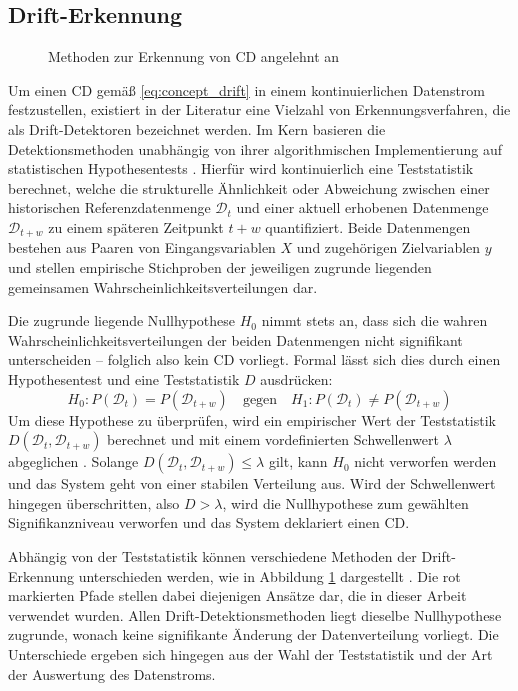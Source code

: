 \subsection{Drift-Erkennung} \label{sec:drift_erkennung}
%
\begin{figure}[hbt!]
    \centering
    
    \caption{Methoden zur Erkennung von \ac{CD} angelehnt an \cite{bayram.2022}}
    \label{fig:drift_detection}
\end{figure}
%
Um einen \ac{CD} gemäß \eqref{eq:concept_drift} in einem kontinuierlichen Datenstrom festzustellen, existiert in der Literatur eine Vielzahl von Erkennungsverfahren, die als Drift-Detektoren bezeichnet werden. Im Kern basieren die Detektionsmethoden unabhängig von ihrer algorithmischen Implementierung auf statistischen Hypothesentests \cite{bayram.2022}. Hierfür wird kontinuierlich eine Teststatistik berechnet, welche die strukturelle Ähnlichkeit oder Abweichung zwischen einer historischen Referenzdatenmenge $\mathcal{D}_t$ und einer aktuell erhobenen Datenmenge $\mathcal{D}_{t+w}$ zu einem späteren Zeitpunkt $t+w$ quantifiziert. Beide Datenmengen bestehen aus Paaren von Eingangsvariablen $X$ und zugehörigen Zielvariablen $y$ und stellen empirische Stichproben der jeweiligen zugrunde liegenden gemeinsamen Wahrscheinlichkeitsverteilungen dar.\par
Die zugrunde liegende Nullhypothese $H_0$ nimmt stets an, dass sich die wahren Wahrscheinlichkeitsverteilungen der beiden Datenmengen nicht signifikant unterscheiden – folglich also kein \ac{CD} vorliegt. Formal lässt sich dies durch einen Hypothesentest und eine Teststatistik $D$ ausdrücken:
%
\begin{equation}
    H_0: P(\mathcal{D}_t) = P(\mathcal{D}_{t+w}) \quad \text{gegen} \quad H_1: P(\mathcal{D}_t) \neq P(\mathcal{D}_{t+w})
    \label{eq:drift_hypothesis}
\end{equation}
%
Um diese Hypothese zu überprüfen, wird ein empirischer Wert der Teststatistik $D(\mathcal{D}_t, \mathcal{D}_{t+w})$ berechnet und mit einem vordefinierten Schwellenwert $\lambda$ abgeglichen \cite{dries.2009}. Solange $D(\mathcal{D}_t, \mathcal{D}_{t+w}) \leq \lambda$ gilt, kann $H_0$ nicht verworfen werden und das System geht von einer stabilen Verteilung aus. Wird der Schwellenwert hingegen überschritten, also $D > \lambda$, wird die Nullhypothese zum gewählten Signifikanzniveau verworfen und das System deklariert einen \ac{CD}. \par
Abhängig von der Teststatistik können verschiedene Methoden der Drift-Erkennung unterschieden werden, wie in Abbildung \ref{fig:drift_detection} dargestellt \cite{bayram.2022}. Die rot markierten Pfade stellen dabei diejenigen Ansätze dar, die in dieser Arbeit verwendet wurden. Allen Drift-Detektionsmethoden liegt dieselbe Nullhypothese zugrunde, wonach keine signifikante Änderung der Datenverteilung vorliegt. Die Unterschiede ergeben sich hingegen aus der Wahl der Teststatistik und der Art der Auswertung des Datenstroms. \par
